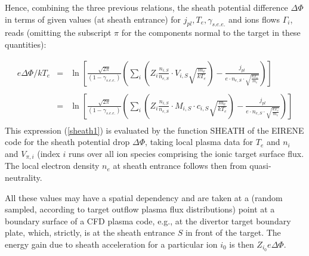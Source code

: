 Hence, combining the three previous relations, the sheath potential difference $\Delta\Phi$
in terms of
given values (at sheath entrance) for $ j_{pl},  T_e, \gamma_{s.e.e.} $ and ions flows $\Gamma_i$,
reads (omitting the subscript $\pi$ for the components normal to the target in these quantities):

\begin{eqnarray} \label{sheath1}
 e \Delta\Phi/kT_e & = &
\ln\left[\frac{\sqrt{2\pi}}{(1-\gamma_{s.e.e.})}\left(\sum_i
\left( Z_i \frac{n_{i,S}}{n_{e,S}}\cdot {V_{i,S}}
\sqrt{\frac{m_e}{kT_e}}\right)-\frac{j_{pl}}{e \cdot n_{e,S} \cdot
\sqrt{\frac{kT_e}{m_e}}}\right)\right]\nonumber \\&&\\
& = & \label{sheath2}
\ln\left\lbrack\frac{\sqrt{2\pi}}{(1-\gamma_{s.e.e.})}\left(\sum_i
\left( Z_i \frac{n_{i,S}}{n_{e,S}} \cdot M_{i,S} \cdot c_{i,S}
\sqrt{\frac{m_e}{kT_e}}\right)-\frac{j_{pl}}{e \cdot n_{e,S} \cdot
\sqrt{\frac{kT_e}{m_e}}}\right)\right\rbrack \nonumber \\ & &
\end{eqnarray}
This expression (\ref{sheath1}) is evaluated by the function SHEATH
of the EIRENE code for the sheath potential drop $\Delta\Phi$, taking local plasma data for $T_e$ and $n_i$
and ${V_{\pi,i}}$  (index $i$ runs over all ion species comprising the ionic target surface flux. The local electron density $n_e$ at sheath entrance  follows then  from quasi-neutrality.

All these values may have a spatial dependency and are taken at a (random sampled, according to target outflow plasma flux distributions)
point at a boundary surface of a CFD plasma code, e.g., at the divertor target boundary
plate, which, strictly, is at the sheath entrance $S$ in front of the target. The energy gain due to sheath acceleration for a particular ion $i_0$
is then $Z_{i_0} e \Delta\Phi$.

